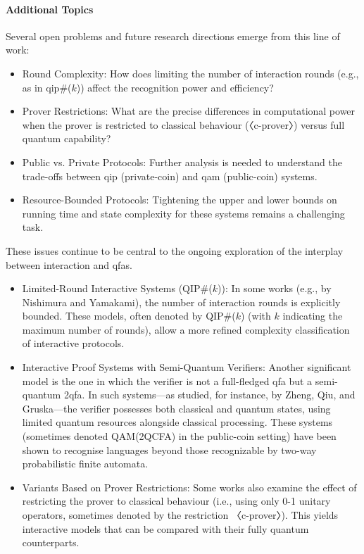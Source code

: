 \paragraph{Additional Topics}
Several open problems and future research directions emerge from this line of work:
\begin{itemize}
  \item Round Complexity: How does limiting the number of interaction rounds (e.g., as in \gls{qip}\#($k$)) affect the recognition power and efficiency?
  \item Prover Restrictions: What are the precise differences in computational power when the prover is restricted to classical behaviour (〈c-prover〉) versus full quantum capability?
  \item Public vs. Private Protocols: Further analysis is needed to understand the trade-offs between \gls{qip} (private-coin) and \gls{qam} (public-coin) systems.
  \item Resource-Bounded Protocols: Tightening the upper and lower bounds on running time and state complexity for these systems remains a challenging task.
\end{itemize}
These issues continue to be central to the ongoing exploration of the interplay between interaction and \glspl{qfa}.

\begin{itemize}
  \item Limited-Round Interactive Systems (QIP\#($k$)): In some works (e.g., by Nishimura and Yamakami), the number of interaction rounds is explicitly bounded. These models, often denoted by QIP\#($k$) (with $k$ indicating the maximum number of rounds), allow a more refined complexity classification of interactive protocols.
  
  \item Interactive Proof Systems with Semi-Quantum Verifiers: Another significant model is the one in which the verifier is not a full-fledged \gls{qfa} but a semi-quantum \gls{2qfa}. In such systems—as studied, for instance, by Zheng, Qiu, and Gruska—the verifier possesses both classical and quantum states, using limited quantum resources alongside classical processing. These systems (sometimes denoted QAM(2QCFA) in the public-coin setting) have been shown to recognise languages beyond those recognizable by two-way probabilistic finite automata.
  
  \item Variants Based on Prover Restrictions: Some works also examine the effect of restricting the prover to classical behaviour (i.e., using only 0-1 unitary operators, sometimes denoted by the restriction 〈c-prover〉). This yields interactive models that can be compared with their fully quantum counterparts.
\end{itemize}

